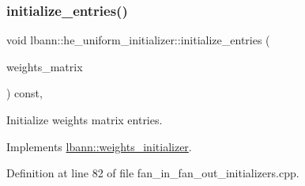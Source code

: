 \subsubsection{\texorpdfstring{initialize\+\_\+entries()}{initialize\_entries()}}
{\footnotesize\ttfamily void lbann\+::he\+\_\+uniform\+\_\+initializer\+::initialize\+\_\+entries (\begin{DoxyParamCaption}\item[{\hyperlink{base_8hpp_a9a697a504ae84010e7439ffec862b470}{Abs\+Dist\+Mat} \&}]{weights\+\_\+matrix }\end{DoxyParamCaption}) const\hspace{0.3cm}{\ttfamily [override]}, {\ttfamily [virtual]}}

Initialize weights matrix entries. 

Implements \hyperlink{classlbann_1_1weights__initializer_a2ad6acf904c0c7bc7406dbd9851107be}{lbann\+::weights\+\_\+initializer}.



Definition at line 82 of file fan\+\_\+in\+\_\+fan\+\_\+out\+\_\+initializers.\+cpp.


